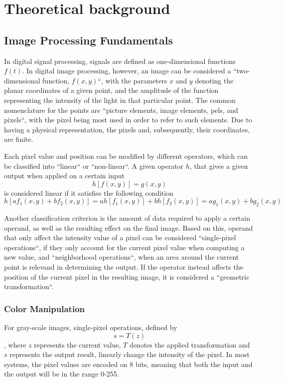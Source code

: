 \chapter{Theoretical background}

\section{Image Processing Fundamentals}

In digital signal processing, signals are defined as one-dimensional functions \(f(t)\). In digital image
processing, however, an image can be considered a ``two-dimensional function, \(f(x, y)\)``, with  the
parameters \(x\) and \(y\) denoting the planar coordinates of a given point, and the amplitude of the function
representing the intensity of the light in that particular point. The common nomenclature for the points
are ``picture elements, image elements, pels, and pixels``, with the pixel being most used in order
to refer to such elements. Due to having a physical representation, the pixels and, subsequently,
their coordinates, are finite. \cite{dipBook}

Each pixel value and position can be modified by different operators, which can be classified into ``linear``
or ``non-linear``. A given operator \(h\), that gives a given output when applied on a certain input \cite{dipBook}
\[h[f(x, y)] = g(x, y)\] 
is considered linear if it satisfies the following condition \cite{dipBook}
\[h[a f_1(x, y) + b f_2(x, y)] = a h[f_1(x, y)] + b h[f_2(x, y)] =
	a g_1(x, y) + b g_2(x, y)\]

Another classification criterion is the amount of data required to apply a certain operand, as well as the
resulting effect on the final image. Based on this, operand that only affect the intensity value of a pixel
can be considered ``single-pixel operations``, if they only account for the current pixel value when computing
a new value, and ``neighborhood operations``, when an area around the current point is relevand in determining
the output. If the operator instead affects the position of the current pixel in the resulting image, it is
considered a ``geometric transformation``. \cite{dipBook}

\subsection{Color Manipulation}

For gray-scale images, single-pixel operations, defined \cite{dipBook} by \[s = T(z)\], where \(z\)
represents the current value, \(T\) denotes the applied transformation and \(s\) represents the output
result, linearly change the intensity of the pixel. In most systems, the pixel values are encoded on 8 bits,
meaning that both the input and the output will be in the range 0-255.

